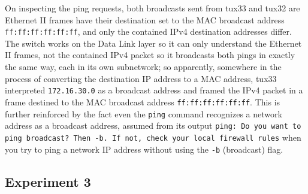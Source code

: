 \documentclass[a4paper, 11pt]{report}
\begin{document}
On inspecting the ping requests, both broadcasts sent from tux33 and tux32 are Ethernet II frames have their destination set to the MAC broadcast address \texttt{ff:ff:ff:ff:ff:ff}, and only the contained IPv4 destination addresses differ.
The switch works on the Data Link layer so it can only understand the Ethernet II frames, not the contained IPv4 packet so it broadcasts both pings in exactly the same way, each in its own subnetwork; so apparently, somewhere in the process of converting the destination IP address to a MAC address, tux33 interpreted \texttt{172.16.30.0} as a broadcast address and framed the IPv4 packet in a frame destined to the MAC broadcast address \texttt{ff:ff:ff:ff:ff:ff}. This is further reinforced by the fact even the \texttt{ping} command recognizes a network address as a broadcast address, assumed from its output \texttt{ping: Do you want to ping broadcast? Then -b. If not, check your local firewall rules} when you try to ping a network IP address without using the \texttt{-b} (broadcast) flag. 

\subsection{Experiment 3} \label{sec:Exp3}
\end{document}

